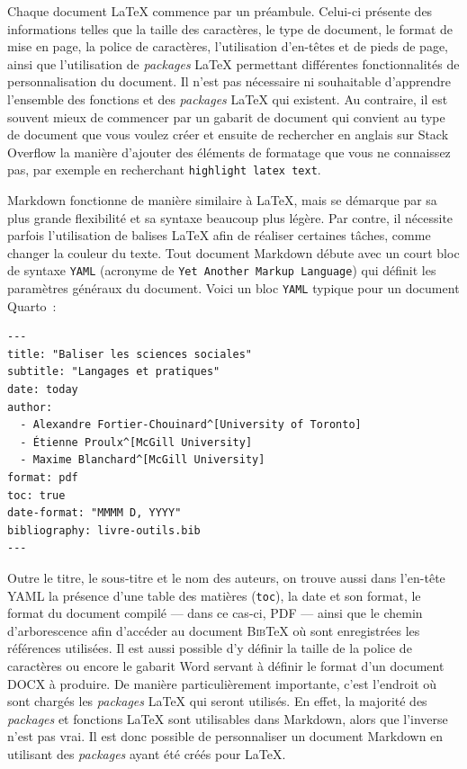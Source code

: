\documentclass[
  letterpaper,
  DIV=11,
  numbers=noendperiod]{scrreprt}
\begin{document}
Chaque document \LaTeX{} commence par un préambule. Celui-ci présente
des informations telles que la taille des caractères, le type de
document, le format de mise en page, la police de caractères,
l'utilisation d'en-têtes et de pieds de page, ainsi que l'utilisation de
\emph{packages} LaTeX permettant différentes fonctionnalités de
personnalisation du document. Il n'est pas nécessaire ni souhaitable
d'apprendre l'ensemble des fonctions et des \emph{packages} LaTeX qui
existent. Au contraire, il est souvent mieux de commencer par un gabarit
de document qui convient au type de document que vous voulez créer et
ensuite de rechercher en anglais sur Stack Overflow la manière d'ajouter
des éléments de formatage que vous ne connaissez pas, par exemple en
recherchant \texttt{highlight\ latex\ text}.

Markdown fonctionne de manière similaire à LaTeX, mais se démarque par
sa plus grande flexibilité et sa syntaxe beaucoup plus légère. Par
contre, il nécessite parfois l'utilisation de balises LaTeX afin de
réaliser certaines tâches, comme changer la couleur du texte. Tout
document Markdown débute avec un court bloc de syntaxe \texttt{YAML}
(acronyme de \texttt{Yet\ Another\ Markup\ Language}) qui définit les
paramètres généraux du document. Voici un bloc \texttt{YAML} typique
pour un document Quarto~:

\begin{verbatim}
---
title: "Baliser les sciences sociales"
subtitle: "Langages et pratiques"
date: today
author:
  - Alexandre Fortier-Chouinard^[University of Toronto]
  - Étienne Proulx^[McGill University]
  - Maxime Blanchard^[McGill University]
format: pdf
toc: true
date-format: "MMMM D, YYYY"
bibliography: livre-outils.bib
---
\end{verbatim}

Outre le titre, le sous-titre et le nom des auteurs, on trouve aussi
dans l'en-tête YAML la présence d'une table des matières (\texttt{toc}),
la date et son format, le format du document compilé --- dans ce cas-ci,
PDF --- ainsi que le chemin d'arborescence afin d'accéder au document
\textsc{Bib}TeX où sont enregistrées les références utilisées. Il est
aussi possible d'y définir la taille de la police de caractères ou
encore le gabarit Word servant à définir le format d'un document DOCX à
produire. De manière particulièrement importante, c'est l'endroit où
sont chargés les \emph{packages} LaTeX qui seront utilisés. En effet, la
majorité des \emph{packages} et fonctions LaTeX sont utilisables dans
Markdown, alors que l'inverse n'est pas vrai. Il est donc possible de
personnaliser un document Markdown en utilisant des \emph{packages}
ayant été créés pour LaTeX.
\end{document}

